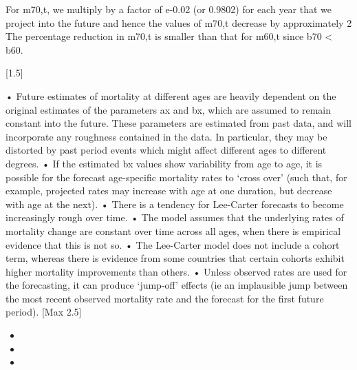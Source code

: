 \documentclass[a4paper,12pt]{article}
\begin{document}
For m70,t, we multiply by a factor of e-0.02 (or 0.9802) for each year that we project into the future and hence the values of m70,t decrease by approximately 2%
The percentage reduction in m70,t is smaller than that for m60,t since b70 < b60.

[1.5]
\item  
• Future estimates of mortality at different ages are heavily dependent on the original estimates of the parameters ax and bx, which are assumed to remain constant into the future. These parameters are estimated from past data, and will incorporate any roughness contained in the data. In particular, they may be distorted by past period events which might affect different ages to different degrees. 
• If the estimated bx values show variability from age to age, it is possible for the forecast age-specific mortality rates to ‘cross over’ (such that, for example, projected rates may increase with age at one duration, but decrease with age at the next). 
• There is a tendency for Lee-Carter forecasts to become increasingly rough over time. 
• The model assumes that the underlying rates of mortality change are constant over time across all ages, when there is empirical evidence that this is not so. 
• The Lee-Carter model does not include a cohort term, whereas there is evidence from some countries that certain cohorts exhibit higher mortality improvements than others. 
• Unless observed rates are used for the forecasting, it can produce ‘jump-off’ effects (ie an implausible jump between the most recent observed mortality rate and the forecast for the first future period). 
[Max 2.5]

\begin{itemize}
\item 
\item 
\item 
\end{itemize}
\end{document}
